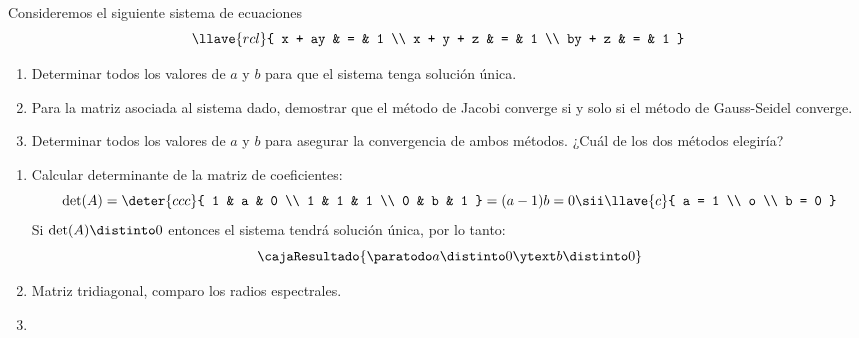 \begin{enunciado}{\ejExtra}{\tiny{}}
	Consideremos el siguiente sistema de ecuaciones
	$$
		\llave{rcl}{
			x + ay & = & 1 \\
			x + y + z &  = & 1 \\
			by + z & = & 1
		}
	$$

	\begin{enumerate}[label=(\alph*)]
		\item Determinar todos los valores de $a$ y $b$ para que el sistema tenga solución única.

		\item Para la matriz asociada al sistema dado, demostrar que el método de Jacobi converge
		      si y solo si el método de Gauss-Seidel converge.

		\item Determinar todos los valores de $a$ y $b$ para asegurar la convergencia de ambos métodos.
		      ¿Cuál de los dos métodos elegiría?
	\end{enumerate}
\end{enunciado}


\begin{enumerate}[label=(\alph*)]
	\item Calcular determinante de la matriz de coeficientes:
	      $$
		      \det(A) =
		      \deter{ccc}{
			      1 & a & 0 \\
			      1 & 1 & 1 \\
			      0 & b & 1
		      }
		      =
		      (a - 1) b = 0
		      \sii
		      \llave{c}{
			      a  =  1 \\
			      o \\
			      b  =  0
		      }
	      $$
	      Si $\det(A) \distinto 0$ entonces el sistema tendrá solución única, por lo tanto:
	      $$
		      \cajaResultado{
			      \paratodo a \distinto 0 \ytext b \distinto 0
		      }
	      $$

	\item Matriz tridiagonal, comparo los radios espectrales.

	\item \hacer
\end{enumerate}


